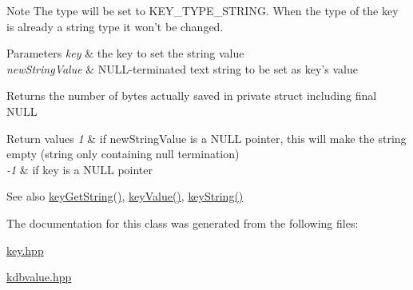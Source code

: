\begin{DoxyNote}{Note}
The type will be set to K\+E\+Y\+\_\+\+T\+Y\+P\+E\+\_\+\+S\+T\+R\+I\+N\+G. When the type of the key is already a string type it won't be changed.
\end{DoxyNote}

\begin{DoxyParams}{Parameters}
{\em key} & the key to set the string value \\
\hline
{\em new\+String\+Value} & N\+U\+L\+L-\/terminated text string to be set as {\ttfamily key's} value \\
\hline
\end{DoxyParams}
\begin{DoxyReturn}{Returns}
the number of bytes actually saved in private struct including final N\+U\+L\+L 
\end{DoxyReturn}

\begin{DoxyRetVals}{Return values}
{\em 1} & if new\+String\+Value is a N\+U\+L\+L pointer, this will make the string empty (string only containing null termination) \\
\hline
{\em -\/1} & if key is a N\+U\+L\+L pointer \\
\hline
\end{DoxyRetVals}
\begin{DoxySeeAlso}{See also}
\hyperlink{group__keyvalue_ga41b9fac5ccddafe407fc0ae1e2eb8778}{key\+Get\+String()}, \hyperlink{group__keyvalue_ga6f29609c5da53c6dc26a98678d5752af}{key\+Value()}, \hyperlink{group__keyvalue_ga880936f2481d28e6e2acbe7486a21d05}{key\+String()} 
\end{DoxySeeAlso}


The documentation for this class was generated from the following files\+:\begin{DoxyCompactItemize}
\item 
\hyperlink{key_8hpp}{key.\+hpp}\item 
\hyperlink{kdbvalue_8hpp}{kdbvalue.\+hpp}\end{DoxyCompactItemize}
